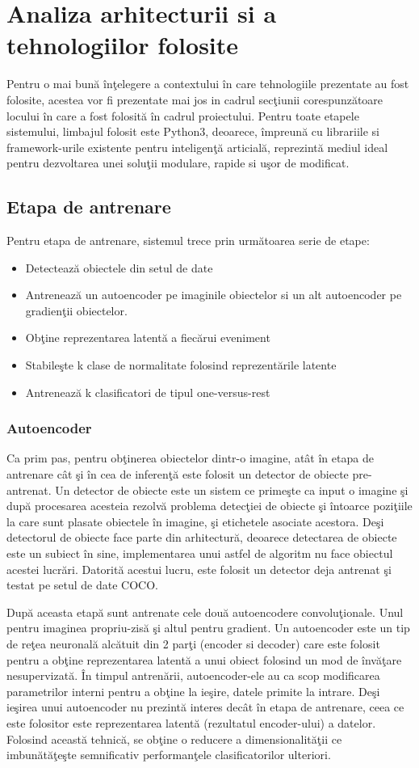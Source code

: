 \documentclass[a4paper,12pt]{report}
\begin{document}
\chapter{Analiza arhitecturii si a tehnologiilor folosite}
\quad Pentru o mai bună înţelegere a contextului în care tehnologiile prezentate au fost folosite, acestea vor fi prezentate mai jos in cadrul secţiunii corespunzătoare locului în care a fost folosită în cadrul proiectului. Pentru toate etapele sistemului, limbajul folosit este Python3, deoarece, împreună cu librariile si framework-urile existente pentru inteligenţă articială, reprezintă mediul ideal pentru dezvoltarea unei soluţii modulare, rapide si uşor de modificat.
\section{Etapa de antrenare}
Pentru etapa de antrenare, sistemul trece prin următoarea serie de etape: 
\begin{itemize}
\item Detectează obiectele din setul de date
\item Antrenează un autoencoder pe imaginile obiectelor si un alt autoencoder pe gradienţii obiectelor.
\item Obţine reprezentarea latentă a fiecărui eveniment
\item Stabileşte k clase de normalitate folosind reprezentările latente
\item Antrenează k clasificatori de tipul one-versus-rest
\end{itemize}
\subsection{Autoencoder}
\quad Ca prim pas, pentru obţinerea obiectelor dintr-o imagine, atât în etapa de antrenare cât şi în cea de inferenţă este folosit un detector de obiecte pre-antrenat. Un detector de obiecte este un sistem ce primeşte ca input o imagine şi după procesarea acesteia rezolvă problema detecţiei de obiecte şi întoarce poziţiile la care sunt plasate obiectele în imagine, şi etichetele asociate acestora. Deşi detectorul de obiecte face parte din arhitectură, deoarece detectarea de obiecte este un subiect în sine, implementarea unui astfel de algoritm nu face obiectul acestei lucrări. Datorită acestui lucru, este folosit un detector deja antrenat şi testat pe setul de date COCO. 
\par După aceasta etapă sunt antrenate cele două autoencodere convoluţionale. Unul pentru imaginea propriu-zisă şi altul pentru gradient. Un autoencoder este un tip de reţea neuronală alcătuit din 2 parţi (encoder si decoder) care este folosit pentru a obţine reprezentarea latentă a unui obiect folosind un mod de învăţare nesupervizată. În timpul antrenării, autoencoder-ele au ca scop modificarea parametrilor interni pentru a obţine la ieşire, datele primite la intrare. Deşi ieşirea unui autoencoder nu prezintă interes decât în etapa de antrenare, ceea ce este folositor este reprezentarea latentă (rezultatul encoder-ului) a datelor. Folosind această tehnică, se obţine o reducere a dimensionalităţii ce imbunătăţeşte semnificativ performanţele clasificatorilor ulteriori.
\par 
\end{document}
